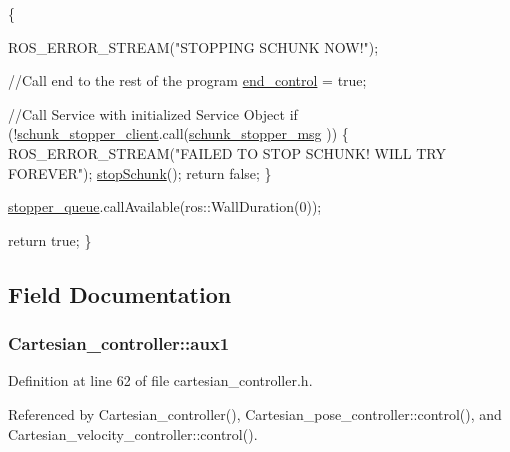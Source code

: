 \begin{DoxyCode}
                                     \{

        ROS\_ERROR\_STREAM(\textcolor{stringliteral}{"STOPPING SCHUNK NOW!"});

        \textcolor{comment}{//Call end to the rest of the program}
        \hyperlink{classCartesian__controller_a3c0a72214891f68e2bad63bf2b688f9c}{end\_control} = \textcolor{keyword}{true};

        \textcolor{comment}{//Call Service with initialized Service Object}
        \textcolor{keywordflow}{if} (!\hyperlink{classCartesian__controller_a4ea7350e0f797c49bc51d3433a761aff}{schunk\_stopper\_client}.call(\hyperlink{classCartesian__controller_a29581ed2f2d8bb97c55e16868bbcc8bd}{schunk\_stopper\_msg}
      ))
        \{
                ROS\_ERROR\_STREAM(\textcolor{stringliteral}{"FAILED TO STOP SCHUNK! WILL TRY FOREVER"});
                \hyperlink{classCartesian__controller_a3ba54e8b35632526c5e8eb2ab5d7de0d}{stopSchunk}();
                \textcolor{keywordflow}{return} \textcolor{keyword}{false};
        \}

        \hyperlink{classCartesian__controller_a52eb090400d8dafaa22aecb037788a66}{stopper\_queue}.callAvailable(ros::WallDuration(0));

        \textcolor{keywordflow}{return} \textcolor{keyword}{true};
\}
\end{DoxyCode}


\subsection{Field Documentation}
\hypertarget{classCartesian__controller_a37edb9c6e2a5066f74941e3659f68cbc}{
\subsubsection[{aux1}]{ Cartesian\-\_\-controller\-::aux1\hspace{0.3cm}{\ttfamily [protected]}}}\label{classCartesian__controller_a37edb9c6e2a5066f74941e3659f68cbc}


Definition at line 62 of file cartesian\-\_\-controller.\-h.



Referenced by Cartesian\-\_\-controller(), Cartesian\-\_\-pose\-\_\-controller\-::control(), and Cartesian\-\_\-velocity\-\_\-controller\-::control().

